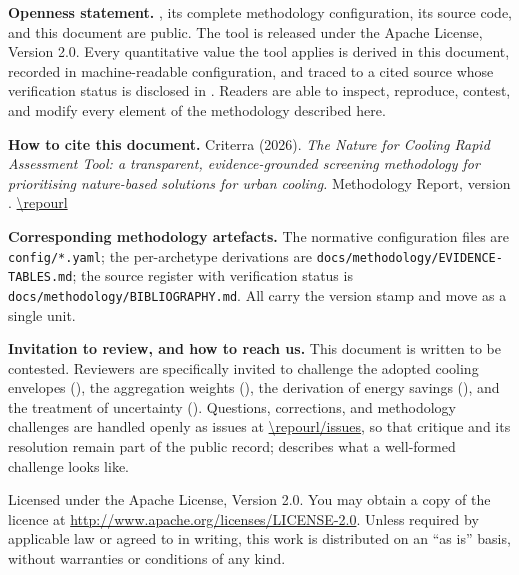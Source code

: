 \begin{titlepage}
\begin{minipage}{0.88\textwidth}
\noindent\textbf{Openness statement.} \Tool{}, its complete methodology
configuration, its source code, and this document are public. The tool is
released under the Apache License, Version 2.0. Every quantitative value the
tool applies is derived in this document, recorded in machine-readable
configuration, and traced to a cited source whose verification status is
disclosed in . Readers are able to inspect, reproduce,
contest, and modify every element of the methodology described here.

\vspace{3mm}

\noindent\textbf{How to cite this document.} Criterra (2026). \emph{The Nature
for Cooling Rapid Assessment Tool: a transparent, evidence-grounded screening
methodology for prioritising nature-based solutions for urban cooling.}
Methodology Report, version \methver{}. \url{\repourl}

\vspace{3mm}

\noindent\textbf{Corresponding methodology artefacts.} The normative
configuration files are \texttt{config/*.yaml}; the per-archetype derivations
are \texttt{docs/methodology/EVIDENCE-TABLES.md}; the source register with
verification status is \texttt{docs/methodology/BIBLIOGRAPHY.md}. All carry the
version stamp \methver{} and move as a single unit.

\vspace{3mm}

\noindent\textbf{Invitation to review, and how to reach us.} This document is
written to be contested. Reviewers are specifically invited to challenge the
adopted cooling envelopes (), the aggregation weights
(), the derivation of energy savings
(), and the treatment of uncertainty
(). Questions, corrections, and methodology challenges
are handled openly as issues at \url{\repourl/issues}, so that critique and its
resolution remain part of the public record;  describes
what a well-formed challenge looks like.
\end{minipage}

\vfill

{\footnotesize\color{criterraink}
Licensed under the Apache License, Version 2.0. You may obtain a copy of the
licence at \url{http://www.apache.org/licenses/LICENSE-2.0}. Unless required by
applicable law or agreed to in writing, this work is distributed on an
``as is'' basis, without warranties or conditions of any kind.\par}

\end{titlepage}
